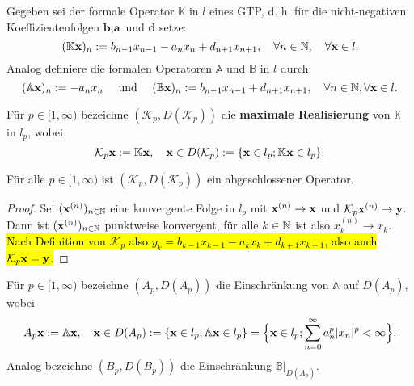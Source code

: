 \begin{konstr}
Gegeben sei der formale Operator  $\mathbb  K$ in $l$ eines GTP, d. h. für die nicht-negativen Koeffizientenfolgen $\textbf{b},\textbf{a}$ und $\textbf{d}$ setze:
\begin{equation*}
(\mathbb K\textnormal{\textbf{x}})_n:=b_{n-1}x_{n-1} -a_nx_n + d_{n+1}x_{n+1},\quad \forall n\in\mathbb{N},\quad\forall \textbf{x}\in l.
\end{equation*}
Analog definiere die formalen Operatoren $\mathbb A$ und $\mathbb B$ in $l$ durch:
\begin{equation*}
(\mathbb A\textbf{x})_n:=-a_nx_n\quad\text{ und }\quad (\mathbb B\textbf{x})_n:=b_{n-1}x_{n-1} + d_{n+1}x_{n+1},\quad\forall n\in\mathbb{N},\forall \textbf{x}\in l.
\end{equation*}
\end{konstr}

\begin{defi}Für $p\in[1,\infty)$ bezeichne $(\mathcal K_p, D(\mathcal K_p))$ die \textbf{maximale Realisierung} von $\mathbb K$ in $l_p$, wobei
\begin{equation*}
\mathcal K_p\textnormal{\textbf{x}}:= \mathbb K\textnormal{\textbf{x}},\quad \textbf{x}\in D(\mathcal K_p):=\{\textnormal{\textbf{x}}\in l_p; \mathbb K\textnormal{\textbf{x}} \in l_p\}.
\end{equation*}
\end{defi}

\begin{prop}\label{Abgeschlossenheit des maximalen Operators K_p}
Für alle $p\in[1,\infty)$ ist $(\mathcal K_p, D(\mathcal K_p))$ ein abgeschlossener Operator.
\end{prop}

\begin{proof}
Sei $(\textnormal{\textbf{x}}^{(n)})_{n\in\mathbb{N}}$ eine konvergente Folge in $l_p$ mit $\textnormal{\textbf{x}}^{(n)}\to \textnormal{\textbf{x}}$ und $\mathcal  K_p\textnormal{\textbf{x}}^{(n)}\to\textnormal{\index{}\textbf y}$. Dann ist $(\textnormal{\textbf{x}}^{(n)})_{n\in\mathbb{N}}$ punktweise konvergent, für alle $k\in\mathbb{N}$ ist also $x_k^{(n)}\to x_k$. \hl{Nach Definition von $\mathcal  K_p$ also $y_k = b_{k-1}x_{k-1} -a_k x_k + d_{k+1} x_{k+1}$, also auch $\mathcal  K_p\textnormal{\textbf{x}} = \textnormal{\index{}\textbf y}$.}
\end{proof}

\begin{defi}
Für  $p\in[1,\infty)$ bezeichne $(A_p, D(A_p))$  die Einschränkung von $\mathbb A$ auf $D(A_p)$, wobei
\begin{equation*}
A_p\textbf{x} := \mathbb A\textbf{x}, \quad \textbf{x}\in D(A_p):= \{\textnormal{\textbf{x}}\in l_p; \mathbb A\textnormal{\textbf{x}}\in l_p\}=\Big\{\textnormal{\textbf{x}}\in l_p; \sum_{n=0}^\infty a_n^p |x_n|^p < \infty \Big\}.
\end{equation*}
Analog bezeichne $(B_p, D(B_p))$ die Einschränkung $\mathbb B|_{D(A_p)}$.
\end{defi}

